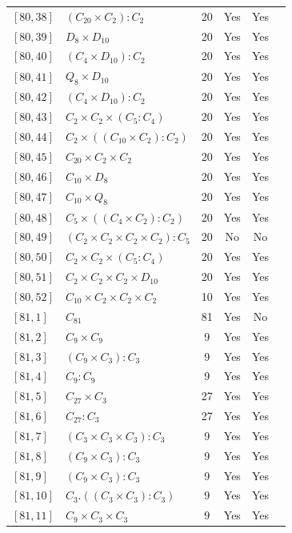 \documentclass[12pt, a4paper]{article}
\theoremstyle{plain}
\theoremstyle{definition}
\begin{document}
\begin{longtable}{llcccl}
  $[80,38]$ & $(C_{20} \times C_2) : C_2$ & 20 & Yes & Yes \\
  $[80,39]$ & $D_8 \times D_{10}$ & 20 & Yes & Yes \\
  $[80,40]$ & $(C_4 \times D_{10}) : C_2$ & 20 & Yes & Yes \\
  $[80,41]$ & $Q_8 \times D_{10}$ & 20 & Yes & Yes \\
  $[80,42]$ & $(C_4 \times D_{10}) : C_2$ & 20 & Yes & Yes \\
  $[80,43]$ & $C_2 \times C_2 \times (C_5 : C_4)$ & 20 & Yes & Yes \\
  $[80,44]$ & $C_2 \times ((C_{10} \times C_2) : C_2)$ & 20 & Yes & Yes \\
  $[80,45]$ & $C_{20} \times C_2 \times C_2$ & 20 & Yes & Yes \\
  $[80,46]$ & $C_{10} \times D_8$ & 20 & Yes & Yes \\
  $[80,47]$ & $C_{10} \times Q_8$ & 20 & Yes & Yes \\
  $[80,48]$ & $C_5 \times ((C_4 \times C_2) : C_2)$ & 20 & Yes & Yes \\
  $[80,49]$ & $(C_2 \times C_2 \times C_2 \times C_2) : C_5$ & 20 & No & No \\
  $[80,50]$ & $C_2 \times C_2 \times (C_5 : C_4)$ & 20 & Yes & Yes \\
  $[80,51]$ & $C_2 \times C_2 \times C_2 \times D_{10}$ & 20 & Yes & Yes \\
  $[80,52]$ & $C_{10} \times C_2 \times C_2 \times C_2$ & 10 & Yes & Yes \\
  $[81,1]$ & $C_{81}$ & 81 & Yes & No \\
  $[81,2]$ & $C_9 \times C_9$ & 9 & Yes & Yes \\
  $[81,3]$ & $(C_9 \times C_3) : C_3$ & 9 & Yes & Yes \\
  $[81,4]$ & $C_9 : C_9$ & 9 & Yes & Yes \\
  $[81,5]$ & $C_{27} \times C_3$ & 27 & Yes & Yes \\
  $[81,6]$ & $C_{27} : C_3$ & 27 & Yes & Yes \\
  $[81,7]$ & $(C_3 \times C_3 \times C_3) : C_3$ & 9 & Yes & Yes \\
  $[81,8]$ & $(C_9 \times C_3) : C_3$ & 9 & Yes & Yes \\
  $[81,9]$ & $(C_9 \times C_3) : C_3$ & 9 & Yes & Yes \\
  $[81,10]$ & $C_3 . ((C_3 \times C_3) : C_3)$ & 9 & Yes & Yes \\
  $[81,11]$ & $C_9 \times C_3 \times C_3$ & 9 & Yes & Yes \\

\end{longtable}
\end{document}
